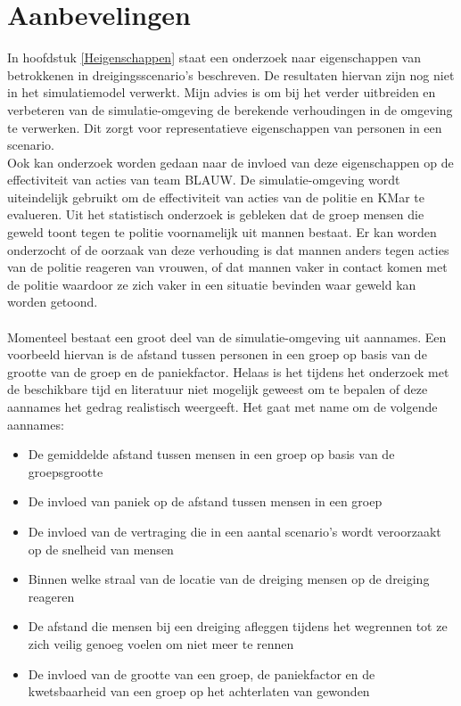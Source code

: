 \documentclass[12pt, letterpaper]{article}
\begin{document}
\section{Aanbevelingen} \label{advies}
In hoofdstuk \ref{Heigenschappen} staat een onderzoek naar eigenschappen van betrokkenen in dreigingsscenario's beschreven. De resultaten hiervan zijn nog niet in het simulatiemodel verwerkt. Mijn advies is om bij het verder uitbreiden en verbeteren van de simulatie-omgeving de berekende verhoudingen in de omgeving te verwerken. Dit zorgt voor representatieve eigenschappen van personen in een scenario.\\ 
Ook kan onderzoek worden gedaan naar de invloed van deze eigenschappen op de effectiviteit van acties van team BLAUW. De simulatie-omgeving wordt uiteindelijk gebruikt om de effectiviteit van acties van de politie en KMar te evalueren. Uit het statistisch onderzoek is gebleken dat de groep mensen die geweld toont tegen te politie voornamelijk uit mannen bestaat. Er kan worden onderzocht of de oorzaak van deze verhouding is dat mannen anders tegen acties van de politie reageren van vrouwen, of dat mannen vaker in contact komen met de politie waardoor ze zich vaker in een situatie bevinden waar geweld kan worden getoond.
\\ \\
Momenteel bestaat een groot deel van de simulatie-omgeving uit aannames. Een voorbeeld hiervan is de afstand tussen personen in een groep op basis van de grootte van de groep en de paniekfactor. Helaas is het tijdens het onderzoek met de beschikbare tijd en literatuur niet mogelijk geweest om te bepalen of deze aannames het gedrag realistisch weergeeft. Het gaat met name om de volgende aannames:
\begin{itemize}
    \item De gemiddelde afstand tussen mensen in een groep op basis van de groepsgrootte
    \item De invloed van paniek op de afstand tussen mensen in een groep
    \item De invloed van de vertraging die in een aantal scenario's wordt veroorzaakt op de snelheid van mensen
    \item Binnen welke straal van de locatie van de dreiging mensen op de dreiging reageren
    \item De afstand die mensen bij een dreiging afleggen tijdens het wegrennen tot ze zich veilig genoeg voelen om niet meer te rennen
    \item De invloed van de grootte van een groep, de paniekfactor en de kwetsbaarheid van een groep op het achterlaten van gewonden
\end{itemize}
\end{document}
